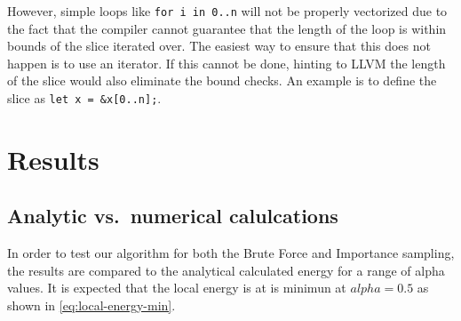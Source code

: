 \documentclass[
]{article}
\begin{document}
However, simple loops like \texttt{for\ i\ in\ 0..n} will not be
properly vectorized due to the fact that the compiler cannot guarantee
that the length of the loop is within bounds of the slice iterated over.
The easiest way to ensure that this does not happen is to use an
iterator. If this cannot be done, hinting to LLVM the length of the
slice would also eliminate the bound checks. An example is to define the
slice as \texttt{let\ x\ =\ \&x{[}0..n{]};}.

\hypertarget{results}{%
\section{Results}\label{results}}

\hypertarget{analytic-vs.-numerical-calulcations}{%
\subsection{Analytic vs.~numerical
calulcations}\label{analytic-vs.-numerical-calulcations}}

In order to test our algorithm for both the Brute Force and Importance
sampling, the results are compared to the analytical calculated energy
for a range of alpha values. It is expected that the local energy is at
is minimun at \(alpha = 0.5\) as shown in \eqref{eq:local-energy-min}.
\end{document}
